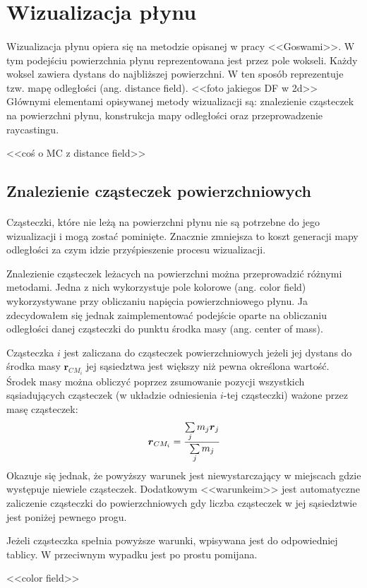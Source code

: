 \newpage

\section{Wizualizacja płynu}

\paragraph{}
Wizualizacja płynu opiera się na metodzie opisanej w pracy <<Goswami>>. W tym podejściu powierzchnia płynu reprezentowana jest przez pole wokseli. Każdy woksel zawiera dystans do najbliższej powierzchni. W ten sposób reprezentuje tzw. mapę odległości (ang. distance field). <<foto jakiegos DF w 2d>>
Głównymi elementami opisywanej metody wizualizacji są: znalezienie cząsteczek na powierzchni płynu, konstrukcja mapy odległości oraz przeprowadzenie raycastingu.
\par
<<coś o MC z distance field>>
\par

\subsection{Znalezienie cząsteczek powierzchniowych}

\paragraph{}
Cząsteczki, które nie leżą na powierzchni płynu nie są potrzebne do jego wizualizacji i mogą zostać pominięte. Znacznie zmniejsza to koszt generacji mapy odległości za czym idzie przyśpieszenie procesu wizualizacji.
\par
Znalezienie cząsteczek leżacych na powierzchni można przeprowadzić różnymi metodami. Jedna z nich wykorzystuje pole kolorowe (ang. color field) wykorzystywane przy obliczaniu napięcia powierzchniowego płynu. Ja zdecydowałem się jednak zaimplementować podejście oparte na obliczaniu odległości danej cząsteczki do punktu środka masy (ang. center of mass).
\par
Cząsteczka $i$ jest zaliczana do cząsteczek powierzchniowych jeżeli jej dystans do środka masy $\boldsymbol{r}_{CM_{i}}$ jej sąsiedztwa jest większy niż pewna określona wartość. Środek masy można obliczyć poprzez zsumowanie pozycji wszystkich sąsiadujących cząsteczek (w układzie odniesienia $i$-tej cząsteczki) ważone przez masę cząsteczek:
\begin{equation}
\boldsymbol{r}_{CM_{i}} = {{\sum\limits_{j} {m_j \boldsymbol{r}_{j}}} \over {\sum\limits_{j} {m_j}}}
\label{eqn:center_mass}
\end{equation}
Okazuje się jednak, że powyższy warunek jest niewystarczający w miejscach gdzie występuje niewiele cząsteczek. Dodatkowym <<warunkeim>> jest automatyczne zaliczenie cząsteczki do powierzchniowych gdy liczba cząsteczek w jej sąsiedztwie jest poniżej pewnego progu.
\par
Jeżeli cząsteczka spełnia powyższe warunki, wpisywana jest do odpowiedniej tablicy. W przeciwnym wypadku jest po prostu pomijana.
\par
<<color field>>
\par

